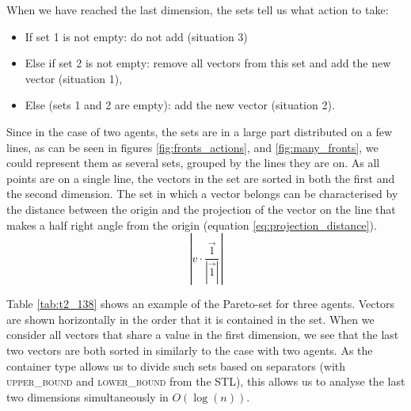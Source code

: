 \documentclass{article}
\begin{document}
\begin{multicols}{2}
	When we have reached the last dimension, the sets tell us what action to
	take:
	\begin{itemize}
		\item If set 1 is not empty: do not add (situation 3)
		\item Else if set 2 is not empty: remove all vectors from this set and
			add the new vector (situation 1),
		\item Else (sets 1 and 2 are empty): add the new vector (situation 2).
	\end{itemize}

	Since in the case of two agents, the sets are in a large part distributed on
	a few lines, as can be seen in figures \ref{fig:fronts_actions}, and
	\ref{fig:many_fronts}, we could represent them as several sets, grouped by
	the lines they are on. As all points are on a single line, the vectors in
	the set are sorted in both the first and the second dimension.
	The set in which a vector belongs can be characterised by the distance
	between the origin and the projection of the vector on the line that makes a
	half right angle from the origin (equation \ref{eq:projection_distance}).
	\begin{equation}
		|v \cdot \frac{\vec{1}}{|\vec{1}|}|
		\label{eq:projection_distance}
	\end{equation}

	Table \ref{tab:t2_138} shows an example of the Pareto-set for three agents.
	Vectors are shown horizontally in the order that it is contained in the
	set. When we consider all vectors that share a value in the first dimension,
	we see that the last two vectors are both sorted in similarly to the case
	with two agents. As the container type allows us to divide such sets based
	on separators (with \textsc{upper\_bound} and \textsc{lower\_bound} from the
	STL), this allows us to analyse the last two dimensions simultaneously in
	$O(\log(n))$.


\end{multicols}
\end{document}
